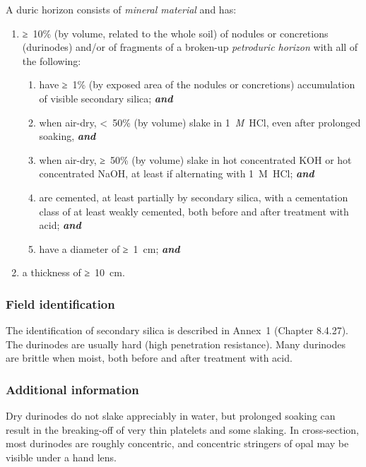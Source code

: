 \documentclass[
  letterpaper,
  DIV=11,
  numbers=noendperiod]{scrreprt}
\providecommand{\tightlist}{%
  \setlength{\itemsep}{0pt}\setlength{\parskip}{0pt}}\usepackage{longtable,booktabs,array}
\begin{document}
A duric horizon consists of \emph{mineral material} and has:

\begin{enumerate}
\def\labelenumi{\arabic{enumi}.}
\tightlist
\item
  ≥~10\% (by volume, related to the whole soil) of nodules or
  concretions (durinodes) and/or of fragments of a broken-up
  \emph{petroduric horizon} with all of the following:

  \begin{enumerate}
  \def\labelenumii{\alph{enumii}.}
  \tightlist
  \item
    have ≥~1\% (by exposed area of the nodules or concretions)
    accumulation of visible secondary silica; \textbf{\emph{and}}
  \item
    when air-dry, \textless~50\% (by volume) slake in 1~\emph{M}~HCl,
    even after prolonged soaking, \textbf{\emph{and}}
  \item
    when air-dry, ≥~50\% (by volume) slake in hot concentrated KOH or
    hot concentrated NaOH, at least if alternating with 1~M~HCl;
    \textbf{\emph{and}}
  \item
    are cemented, at least partially by secondary silica, with a
    cementation class of at least weakly cemented, both before and after
    treatment with acid; \textbf{\emph{and}}
  \item
    have a diameter of ≥~1~cm; \textbf{\emph{and}}
  \end{enumerate}
\item
  a thickness of ≥~10~cm.
\end{enumerate}

\hypertarget{field-identification-6}{%
\subsubsection{Field identification}\label{field-identification-6}}

The identification of secondary silica is described in Annex~1 (Chapter
8.4.27). The durinodes are usually hard (high penetration resistance).
Many durinodes are brittle when moist, both before and after treatment
with acid.

\hypertarget{additional-information-5}{%
\subsubsection{Additional information}\label{additional-information-5}}

Dry durinodes do not slake appreciably in water, but prolonged soaking
can result in the breaking-off of very thin platelets and some slaking.
In cross-section, most durinodes are roughly concentric, and concentric
stringers of opal may be visible under a hand lens.
\end{document}
